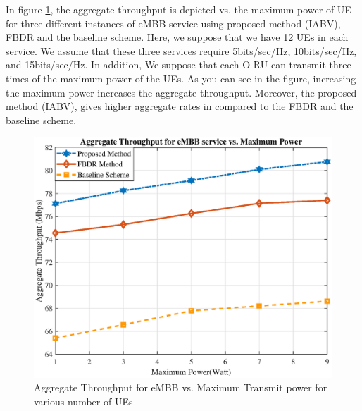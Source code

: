 \documentclass[conference]{IEEEtran}
\begin{document}
In figure \ref{fig:5}, the aggregate throughput is depicted vs. the maximum power of UE for three different instances of eMBB service using proposed method (IABV), FBDR and the baseline scheme. Here, we suppose that we have 12 UEs in each service.  We assume that these three services require 5bits/sec/Hz, 10bits/sec/Hz, and 15bits/sec/Hz.
In addition, We suppose that each O-RU can transmit three times of the maximum power of the UEs. As you can see in the figure, increasing the maximum power increases the aggregate throughput. Moreover, the proposed method (IABV), gives higher aggregate rates in compared to the FBDR and the baseline scheme.  

\begin{figure}
  \centering 
    \includegraphics[scale = 0.47]{RatePower1.eps}
  \caption{Aggregate Throughput for eMBB vs. Maximum Transmit power for various number of UEs }
  \label{fig:5}
\end{figure}
\end{document}
